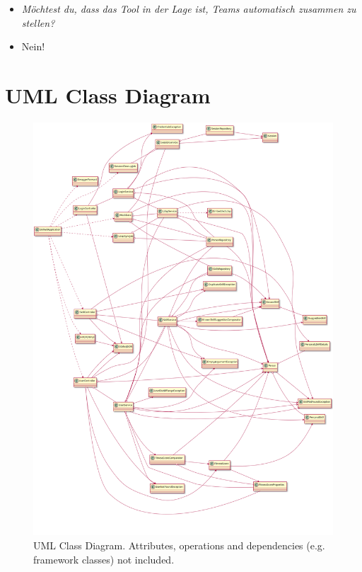 \begin{appendices}
\begin{itemize}
\item[] \textit{Möchtest du, dass das Tool in der Lage ist, Teams automatisch zusammen zu stellen?}
\item[] Nein!
\end{itemize}





\chapter{UML Class Diagram}
\label{uml_classes}
\begin{figure}[!h]
    \centering
    \includegraphics[height=0.75\textheight]{images/uml.png}
    \caption[Diagram: UML Class Diagram]{UML Class Diagram. Attributes, operations and dependencies (e.g. framework classes) not included.}
\end{figure}






\end{appendices}
